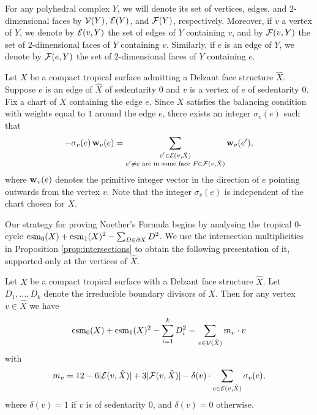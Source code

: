 For any polyhedral complex $Y$, we will denote its set of vertices, edges, and $2$-dimensional faces by ${\mathcal V}(Y)$, ${\mathcal E}(Y)$, and ${\mathcal F}(Y)$, respectively.
Moreover, if $v$ a vertex of $Y$, we denote by ${\mathcal E}(v,Y)$ the set of edges of $Y$ containing $v$, and by ${\mathcal F}(v,Y)$ the set of $2$-dimensional faces of $Y$ containing $v$.
Similarly, if $e$ is an edge of $Y$, we denote by ${\mathcal F}(e,Y)$ the set of $2$-dimensional faces of $Y$ containing $e$.


Let $X$ be a compact tropical surface admitting a Delzant face structure $\hat X$.
Suppose $e$ is an edge of $\hat X$ of sedentarity $0$ and $v$ is a vertex of $e$ of sedentarity $0$.
Fix a chart of $X$ containing the edge $e$.
Since $X$ satisfies the balancing condition with weights equal to $1$ around the edge $e$, there exists an integer $\sigma_v(e)$ such that
\begin{equation}\label{eqn:sigma} 
- \sigma_v(e) \, \mathbf w_{v}(e) = \sum_{\substack{e' \in {{\mathcal E}}(v, \hat X) \\ e' \neq e \text{ are in some face } F \in {{\mathcal F}}(v, \hat X)}} \mathbf w_{v}(e'),
\end{equation}
where $\mathbf w_{v}(e)$ denotes the primitive integer vector in the direction of $e$ pointing outwards from the vertex $v$. 
Note that the integer $\sigma_v(e)$ is independent of the chart chosen for $X$.


Our strategy for proving Noether's Formula begins by analysing the tropical $0$-cycle 
$\operatorname{csm}_0(X) + \operatorname{csm}_1(X)^2 - \sum_{D \in \partial X} D^2$.
We use the intersection multiplicities in Proposition \ref{prop:intersections} 
to obtain the following presentation of it, supported only at the vertices of $\hat X$.

\begin{lemma}\label{lem:localcontribution}
Let $X$ be a compact tropical surface with a Delzant face structure $\hat{X}$. Let $D_1, \dots, D_k$ denote the irreducible boundary divisors of $X$. Then for any vertex $v \in \hat{X}$ we have 
$$\operatorname{csm}_0(X) + \operatorname{csm}_1(X)^2 - \sum_{i = 1}^k D_i^2 = \sum_{v \in {\mathcal V}(\hat X)} m_v \cdot v$$
with
$$
m_v = 12 - 6|{{\mathcal E}}(v, \hat{X})| + 3|{{\mathcal F}}(v, \hat{X})| - \delta(v) \cdot \sum_{e \in {{\mathcal E}}(v, \hat{X})} \sigma_v(e),
$$
where $\delta(v) = 1$ if $v$ is of sedentarity $0$, and $\delta(v)= 0$ otherwise.
\end{lemma}



